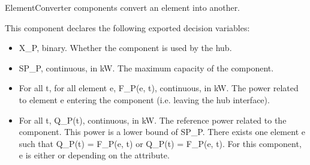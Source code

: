 \documentclass[letterpaper,10pt,english]{sphinxmanual}
\begin{document}
\begin{fulllineitems}
\label{\detokenize{generated/tamos.production.ElementConverter:tamos.production.ElementConverter}}
\pysigstartsignatures
{}
\pysigstopsignatures{}

\begin{fulllineitems}
\label{\detokenize{generated/tamos.production.ElementConverter:tamos.production.ElementConverter.__init__}}
\pysigstartsignatures
{}
\pysigstopsignatures
\sphinxAtStartPar
ElementConverter components convert an element into another.

\sphinxAtStartPar
This component declares the following exported decision variables:
\begin{itemize}
\item {} 
\sphinxAtStartPar
X\_P, binary.
Whether the component is used by the hub.

\item {} 
\sphinxAtStartPar
SP\_P, continuous, in kW.
The maximum capacity of the component.

\item {} 
\sphinxAtStartPar
For all t, for all element e, F\_P(e, t), continuous, in kW.
The power related to element e entering the component (i.e. leaving the hub interface).

\item {} 
\sphinxAtStartPar
For all t, Q\_P(t), continuous, in kW.
The reference power related to the component.
This power is a lower bound of SP\_P.
There exists one element e such that Q\_P(t) = F\_P(e, t) or Q\_P(t) = \sphinxhyphen{} F\_P(e, t).
For this component, e is either  or  depending on the  attribute.

\end{itemize}


\end{fulllineitems}
\end{fulllineitems}
\end{document}
